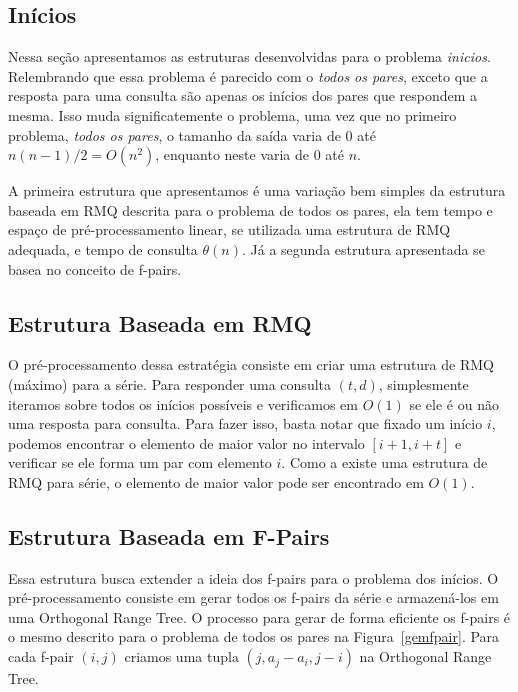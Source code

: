 \documentclass[12pt]{article}
\begin{document}
\subsection{Inícios}

Nessa seção apresentamos as estruturas desenvolvidas para o problema \textit{inicios}.
Relembrando que essa problema é parecido com o \textit{todos os pares}, exceto que a
resposta para uma consulta são apenas os inícios dos pares que respondem a mesma. Isso
muda significatemente o problema, uma vez que no primeiro problema, \textit{todos os pares},
o tamanho da saída varia de $0$ até $n(n-1)/2 = O(n^2)$, enquanto neste varia de $0$ até $n$.

A primeira estrutura que apresentamos é uma variação bem simples da estrutura baseada
em RMQ descrita para o problema de todos os pares, ela tem tempo e espaço de pré-processamento
linear, se utilizada uma estrutura de RMQ adequada, e tempo de consulta $\theta(n)$. Já
a segunda estrutura apresentada se basea no conceito de f-pairs.

\subsection{Estrutura Baseada em RMQ}

O pré-processamento dessa estratégia consiste em criar uma estrutura de RMQ (máximo)
para a série. Para responder uma consulta $(t, d)$, simplesmente iteramos sobre todos
os inícios possíveis e verificamos em $O(1)$ se ele é ou não uma resposta para consulta.
Para fazer isso, basta notar que fixado um início $i$, podemos encontrar o elemento de maior valor
no intervalo $[i + 1, i + t]$ e verificar se ele forma um par com elemento $i$.
 Como a existe uma estrutura de RMQ para série, o elemento de maior valor
pode ser encontrado em $O(1)$.


\subsection{Estrutura Baseada em F-Pairs}

Essa estrutura busca extender a ideia dos f-pairs para o problema dos inícios.
O pré-processamento consiste em gerar todos os f-pairs da série e armazená-los
em uma Orthogonal Range Tree. O processo para gerar de forma eficiente os f-pairs é o mesmo
descrito para o problema de todos os pares na Figura~\ref{gemfpair}. Para cada 
f-pair $(i, j)$ criamos uma tupla $(j, a_j - a_i, j - i)$ na Orthogonal Range Tree.
\end{document}
